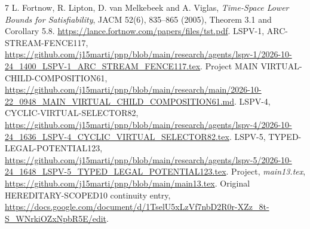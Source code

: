 \documentclass[11pt]{article}
\begin{document}
\begin{thebibliography}{7}
 L. Fortnow, R. Lipton, D. van Melkebeek and A. Viglas, \emph{Time-Space Lower Bounds for Satisfiability}, JACM 52(6), 835--865 (2005), Theorem 3.1 and Corollary 5.8. \url{https://lance.fortnow.com/papers/files/tst.pdf}.
 LSPV-1, ARC-STREAM-FENCE117, \url{https://github.com/j15marti/pnp/blob/main/research/agents/lspv-1/2026-10-24_1400_LSPV-1_ARC_STREAM_FENCE117.tex}.
 Project MAIN VIRTUAL-CHILD-COMPOSITION61, \url{https://github.com/j15marti/pnp/blob/main/research/main/2026-10-22_0948_MAIN_VIRTUAL_CHILD_COMPOSITION61.md}.
 LSPV-4, CYCLIC-VIRTUAL-SELECTOR82, \url{https://github.com/j15marti/pnp/blob/main/research/agents/lspv-4/2026-10-24_1636_LSPV-4_CYCLIC_VIRTUAL_SELECTOR82.tex}.
 LSPV-5, TYPED-LEGAL-POTENTIAL123, \url{https://github.com/j15marti/pnp/blob/main/research/agents/lspv-5/2026-10-24_1648_LSPV-5_TYPED_LEGAL_POTENTIAL123.tex}.
 Project, \emph{main13.tex}, \url{https://github.com/j15marti/pnp/blob/main/main13.tex}.
 Original HEREDITARY-SCOPED10 continuity entry, \url{https://docs.google.com/document/d/1TselU5xLzVf7nbD2R0r-XZz_8t-S_WNrkiOZxNpbR5E/edit}.
\end{thebibliography}
\end{document}
